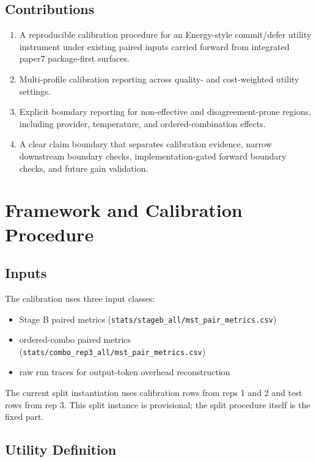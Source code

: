 \documentclass[11pt,a4paper]{article}
\begin{document}
\subsection{Contributions}

\begin{enumerate}
  \item A reproducible calibration procedure for an Energy-style commit/defer utility instrument under existing paired inputs carried forward from integrated paper7 package-first surfaces.
  \item Multi-profile calibration reporting across quality- and cost-weighted utility settings.
  \item Explicit boundary reporting for non-effective and disagreement-prone regions, including provider, temperature, and ordered-combination effects.
  \item A clear claim boundary that separates calibration evidence, narrow downstream boundary checks, implementation-gated forward boundary checks, and future gain validation.
\end{enumerate}

\section{Framework and Calibration Procedure}
\label{sec:framework}

\subsection{Inputs}
\label{sec:inputs}

The calibration uses three input classes:
\begin{itemize}
  \item Stage B paired metrics (\texttt{stats/stageb\_all/mst\_pair\_metrics.csv})
  \item ordered-combo paired metrics (\texttt{stats/combo\_rep3\_all/mst\_pair\_metrics.csv})
  \item raw run traces for output-token overhead reconstruction
\end{itemize}

The current split instantiation uses calibration rows from reps 1 and 2 and test rows from rep 3. This split instance is provisional; the split procedure itself is the fixed part.

\subsection{Utility Definition}
\label{sec:utility}
\end{document}
